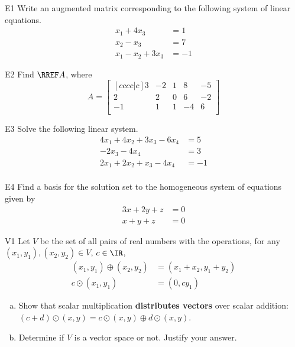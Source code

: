 \documentclass{sbgLAexam}
\begin{document}
\begin{problem}{E1}
Write an augmented matrix corresponding to the following system of linear equations.
\begin{align*}
x_1+4x_3 &= 1 \\
x_2-x_3 &= 7 \\
x_1-x_2+3x_3 &= -1
\end{align*}
\end{problem}

\begin{problem}{E2}
Find \(\RREF A\), where
\[
  A =
  \begin{bmatrix}[cccc|c]
    3 & -2 & 1 & 8 & -5 \\
    2 & 2 & 0 & 6 & -2 \\
    -1 & 1 & 1 & -4 & 6 \\
  \end{bmatrix}
\]
\end{problem}

\begin{problem}{E3}
Solve the following linear system.
\begin{align*}
4x_1+4x_2+3x_3-6x_4 &= 5 \\
-2x_3-4x_4 &= 3 \\
2x_1+2x_2+x_3-4x_4 &= -1 \\
\end{align*}
\end{problem}

\begin{problem}{E4}
Find a basis for the solution set to the homogeneous system of equations
given by
\begin{align*}
3x+2y+z &= 0 \\
x+y+z &= 0
\end{align*}
\end{problem}

\begin{problem}{V1}
Let $V$ be the set of all pairs of real numbers with the operations, for any $(x_1,y_1), (x_2,y_2) \in V$, $c \in \IR$,
\begin{align*}
(x_1,y_1) \oplus (x_2,y_2) &= (x_1+x_2,y_1+y_2) \\
c \odot (x_1,y_1) &= (0, cy_1)
\end{align*}
\begin{enumerate}[(a)]
\item Show that scalar multiplication
      \textbf{distributes vectors} over scalar addition:
      \((c+d)\odot(x,y)=
      c\odot(x,y) \oplus d\odot(x,y)\).
\item Determine if $V$ is a vector space or not.  Justify your answer.
\end{enumerate}
\end{problem}
\end{document}
